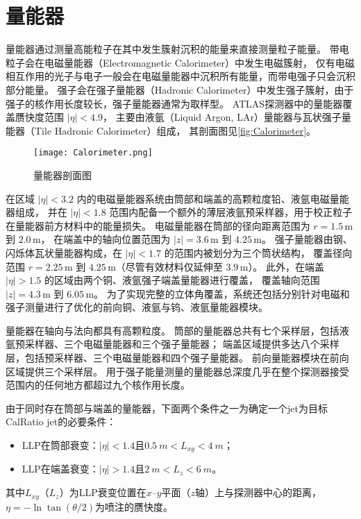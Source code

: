 \section{量能器}
量能器通过测量高能粒子在其中发生簇射沉积的能量来直接测量粒子能量。
带电粒子会在电磁量能器（Electromagnetic Calorimeter）中发生电磁簇射，
仅有电磁相互作用的光子与电子一般会在电磁量能器中沉积所有能量，而带电强子只会沉积部分能量。
强子会在强子量能器（Hadronic Calorimeter）中发生强子簇射，由于强子的核作用长度较长，强子量能器通常为取样型。
ATLAS探测器中的量能器覆盖赝快度范围 \( |\eta| < 4.9 \)，
主要由液氩（Liquid Argon, LAr）量能器与瓦状强子量能器（Tile Hadronic Calorimeter）组成，
其剖面图见\autoref{fig:Calorimeter}。

\begin{figure}[ht]
    \centering
    \texttt{[image: Calorimeter.png]}
    \caption{量能器剖面图\cite{ATLAS_detector}}
    \label{fig:Calorimeter}
\end{figure}

在区域 \( |\eta| < 3.2 \) 内的电磁量能器系统由筒部和端盖的高颗粒度铅、液氩电磁量能器组成，
并在 \( |\eta| < 1.8 \) 范围内配备一个额外的薄层液氩预采样器，用于校正粒子在量能器前方材料中的能量损失。
电磁量能器在筒部的径向距离范围为 \( r = 1.5\,\text{m} \) 到 \( 2.0\,\text{m} \)，
在端盖中的轴向位置范围为 \( |z| = 3.6\,\text{m} \) 到 \( 4.25\,\text{m} \)。
强子量能器由钢、闪烁体瓦状量能器构成，在 \( |\eta| < 1.7 \) 的范围内被划分为三个筒状结构，
覆盖径向范围 \( r = 2.25\,\text{m} \) 到 \( 4.25\,\text{m} \)（尽管有效材料仅延伸至 \( 3.9\,\text{m} \)）。
此外，在端盖 \( |\eta| > 1.5 \) 的区域由两个铜、液氩强子端盖量能器进行覆盖，
覆盖轴向范围 \( |z| = 4.3\,\text{m} \) 到 \( 6.05\,\text{m} \)。
为了实现完整的立体角覆盖，系统还包括分别针对电磁和强子测量进行了优化的前向铜、液氩与钨、液氩量能器模块。

量能器在轴向与法向都具有高颗粒度。
筒部的量能器总共有七个采样层，包括液氩预采样器、三个电磁量能器和三个强子量能器；
端盖区域提供多达八个采样层，包括预采样器、三个电磁量能器和四个强子量能器。
前向量能器模块在前向区域提供三个采样层。
用于强子能量测量的量能器总深度几乎在整个探测器接受范围内的任何地方都超过九个核作用长度。

由于同时存在筒部与端盖的量能器，下面两个条件之一为确定一个jet为目标CalRatio jet的必要条件：
\begin{itemize}
    \item LLP在筒部衰变：$|\eta|<1.4$且$\SI{0.5}{m}<L_{xy}<\SI{4}{m}$；
    \item LLP在端盖衰变：$|\eta|>1.4$且$\SI{2}{m}<L_{z}<\SI{6}{m}$。
\end{itemize}
其中$L_{xy}$（$L_{z}$）为LLP衰变位置在$x$--$y$平面（$z$轴）上与探测器中心的距离，
$\eta=-\ln \tan ({\theta}/{2})$为喷注的赝快度。

